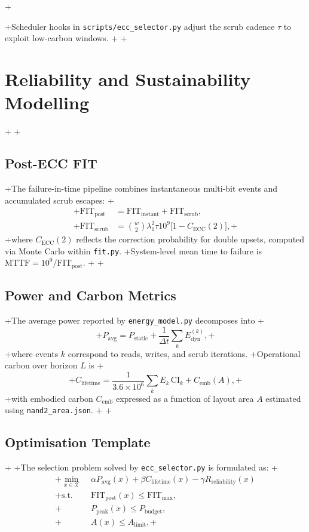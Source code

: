 +\documentclass[conference]{IEEEtran}
\begin{document}
+Scheduler hooks in \texttt{scripts/ecc\_selector.py} adjust the scrub cadence $\tau$ to exploit low-carbon windows.
+
+\section{Reliability and Sustainability Modelling}
+\label{sec:reliability}
+\subsection{Post-ECC FIT}
+The failure-in-time pipeline combines instantaneous multi-bit events and accumulated scrub escapes:
+\begin{align}
+\text{FIT}_{\text{post}} &= \text{FIT}_{\text{instant}} + \text{FIT}_{\text{scrub}},\\
+\text{FIT}_{\text{scrub}} &= \binom{w}{2} \lambda_{1}^{2} \tau 10^{9} \bigl[1-C_{\text{ECC}}(2)\bigr],
+\end{align}
+where $C_{\text{ECC}}(2)$ reflects the correction probability for double upsets, computed via Monte Carlo within \texttt{fit.py}.
+System-level mean time to failure is $\text{MTTF}=10^{9}/\text{FIT}_{\text{post}}$.
+
+\subsection{Power and Carbon Metrics}
+The average power reported by \texttt{energy\_model.py} decomposes into
+\begin{equation}
+P_{\text{avg}} = P_{\text{static}} + \frac{1}{\Delta t} \sum_{k} E_{\text{dyn}}^{(k)},
+\end{equation}
+where events $k$ correspond to reads, writes, and scrub iterations.
+Operational carbon over horizon $L$ is
+\begin{equation}
+C_{\text{lifetime}} = \frac{1}{3.6\times10^{6}} \sum_{k} E_{k}\,\text{CI}_{k} + C_{\text{emb}}(A),
+\end{equation}
+with embodied carbon $C_{\text{emb}}$ expressed as a function of layout area $A$ estimated using \texttt{nand2\_area.json}.
+
+\subsection{Optimisation Template}
+\label{sec:optimisation}
+The selection problem solved by \texttt{ecc\_selector.py} is formulated as:
+\begin{align}
+\min_{x \in \mathcal{X}} & \; \alpha P_{\text{avg}}(x) + \beta C_{\text{lifetime}}(x) - \gamma R_{\text{reliability}}(x) \\
+\text{s.t.} & \; \text{FIT}_{\text{post}}(x) \leq \text{FIT}_{\max},\\
+& \; P_{\text{peak}}(x) \leq P_{\text{budget}},\\
+& \; A(x) \leq A_{\text{limit}},
+\end{align}
\end{document}
